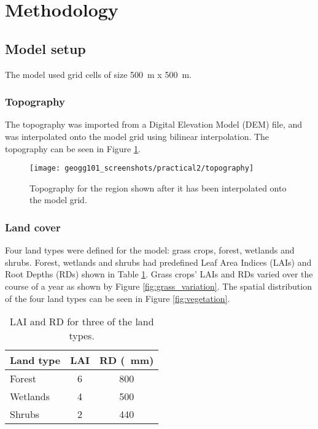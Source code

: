 \documentclass{article}
\begin{document}
\newpage
\section{Methodology}

\subsection{Model setup}

The model used grid cells of size \SI{500}{m} x \SI{500}{m}.

\subsubsection{Topography}

The topography was imported from a Digital Elevation Model (DEM) file, and was interpolated onto the model grid using bilinear interpolation. The topography can be seen in Figure \ref{fig:topography}.

\begin{figure}[!h]
    \centering
    \texttt{[image: geogg101\_screenshots/practical2/topography]}
    \caption{Topography for the region shown after it has been interpolated onto the model grid.}
    \label{fig:topography}
\end{figure}

\subsubsection{Land cover}

Four land types were defined for the model: grass crops, forest, wetlands and shrubs. Forest, wetlands and shrubs had predefined Leaf Area Indices (LAIs) and Root Depths (RDs) shown in Table \ref{table:lai_rd}. Grass crops' LAIs and RDs varied over the course of a year as shown by Figure \ref{fig:grass_variation}. The spatial distribution of the four land types can be seen in Figure \ref{fig:vegetation}.

\setlength\extrarowheight{3pt}
\begin{table}[!h]
    \centering
    \begin{tabular}{l c c}
	Land type   & LAI & RD (\SI{}{mm}) \\
	    \hline
	    Forest & \num{6} & \num{800} \\
	    Wetlands & \num{4} & \num{500} \\
	    Shrubs & \num{2} & \num{440} \\
    \end{tabular}
    \caption{LAI and RD for three of the land types.}
    \label{table:lai_rd}
\end{table}
\end{document}
